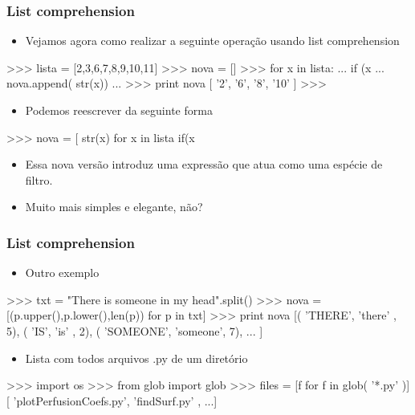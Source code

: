\documentclass[12pt,t,graphics]{beamer}
\newcommand{\ft}[1]{\frametitle{#1}}
\newcommand{\bi}{\begin{itemize}}
\newcommand{\ei}{\end{itemize}}
\begin{document}

\begin{frame}[fragile]
  \ft{List comprehension}
  \bi
\item Vejamos agora como realizar a seguinte operação
  usando list comprehension
  \ei
  \begin{python}
>>> lista = [2,3,6,7,8,9,10,11]
>>> nova = []
>>> for x in lista:
...     if (x%
...         nova.append( str(x))
...
>>> print nova
[ '2', '6', '8', '10' ]
>>>	
  \end{python}
  \bi
\item Podemos reescrever da seguinte forma
  \ei
  \begin{python}
>>> nova = [ str(x) for x in lista if(x%
  \end{python}
  \bi
\item Essa nova versão introduz uma expressão que atua
  como uma espécie de filtro.
\item Muito mais simples e elegante, não?
  \ei	
\end{frame}


\begin{frame}[fragile]
  \ft{List comprehension}
  \bi
\item Outro exemplo
  \ei
  \begin{python}
>>> txt = "There is someone in my head".split()
>>> nova = [(p.upper(),p.lower(),len(p)) for p in txt]
>>> print nova
[( 'THERE', 'there' , 5),
( 'IS', 'is' , 2),
( 'SOMEONE', 'someone', 7),
...
]	
  \end{python}	
  \bi
\item Lista com todos arquivos .py de um diretório
  \ei
  \begin{python}
>>> import os
>>> from glob import glob
>>> files = [f for f in glob( '*.py' )]
[ 'plotPerfusionCoefs.py', 'findSurf.py' , ...]	
  \end{python}		
\end{frame}

\end{document}
